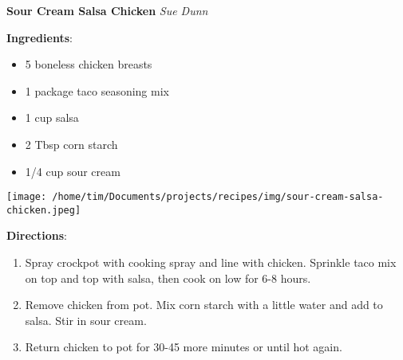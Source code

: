 \documentclass[11pt, twoside, openany]{book}
\begin{document}
\noindent\begin{minipage}[t]{\linewidth}%
{\Large\textbf{Sour Cream Salsa Chicken}} \label{sour-cream-salsa-chicken}\hfill\textit{Sue Dunn}\\
\noindent\begin{minipage}[t]{0.78\linewidth}%
\textbf{Ingredients}:\vspace{-3mm}
\begin{multicols}{2}
\begin{itemize}\setlength\itemsep{-1mm}
\item 5 boneless chicken breasts
\item 1 package taco seasoning mix
\item 1 cup salsa
\item 2 Tbsp corn starch
\item 1/4 cup sour cream
\end{itemize}
\end{multicols}
\end{minipage}
\noindent\begin{minipage}[t]{0.18\linewidth}
\centering \strut\vspace*{-\baselineskip}\newline
\texttt{[image: /home/tim/Documents/projects/recipes/img/sour-cream-salsa-chicken.jpeg]}\\
\end{minipage}\vspace{3mm}
\textbf{Directions}:
\vspace{-3mm}\begin{enumerate}\setlength\itemsep{-1mm}
\item Spray crockpot with cooking spray and line with chicken. Sprinkle taco mix on top and top with salsa, then cook on low for 6-8 hours.
\item Remove chicken from pot. Mix corn starch with a little water and add to salsa. Stir in sour cream.
\item Return chicken to pot for 30-45 more minutes or until hot again.
\end{enumerate}
\end{minipage}\vspace{8mm}
\end{document}
